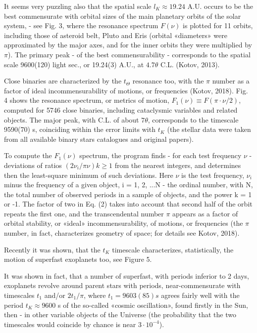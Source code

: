 \documentclass[twoside,draft]{article}
\begin{document}
\begin{sloppypar}
{It seems very puzzling also that the spatial scale $l_{K} \approx 19.24$ A.U. occurs to be the best
commensurate with orbital sizes of the main planetary orbits of the solar system, - see Fig. 3,
where the resonance spectrum $F( \nu )$ is plotted for 11 orbits, including those of asteroid belt, Pluto
and Eris (orbital «diameters» were approximated by the major axes, and for the inner orbits they
were multiplied by $\pi$). The primary peak - of the best commensurability - corresponds to the
spatial scale 9600(120) light sec., or 19.24(3) A.U., at $4.7 \theta$ C.L. (Kotov, 2013).

Close binaries are characterized by the $t_{\Theta}$ resonance too, with the $\pi$ number as a factor of ideal
incommensurability of motions, or frequencies (Kotov, 2018). Fig. 4 shows the resonance spectrum,
or metrics of motion, $F_{1} (\nu) \equiv F(\pi \cdot \nu/2)$, computed for 5746 close binaries, including cataclysmic
variables and related objects. The major peak, with C.L. of about $7 \theta$, corresponds to the timescale
9590(70) s, coinciding within the error limits with $t_{K}$ (the stellar data were taken from all available
binary stars catalogues and original papers).

To compute the $F_{1} (\nu)$ spectrum, the program finds - for each test frequency $\nu$ - deviations of
ratios $(2\nu_{i} /\pi \nu) k \geq 1$ from the nearest integers, and determines then the least-square minimum of such
deviations. Here $\nu$ is the test frequency, $\nu_{i}$ minus the frequency of a given object, i = 1, 2, ...N - the
ordinal number, with N, the total number of observed periods in a sample of objects, and the power
k = 1 or -1. The factor of two in Eq. (2) takes into account that second half of the orbit repeats the
first one, and the transcendental number $\pi$ appears as a factor of orbital stability, or «ideal»
incommensurability, of motions, or frequencies (the $\pi$ number, in fact, characterizes geometry of
space; for details see Kotov, 2018).

Recently it was shown, that the $t_K$ timescale characterizes, statistically, the motion of superfast
exoplanets too, see Figure 5.

It was shown in fact, that a number of superfast, with periods inferior to 2 days, exoplanets revolve
around parent stars with periods, near-commensurate with timescales $t_{1}$ and/or $2 t_{1}/\pi$, where $t_{1} =
9603(85) s$ agrees fairly well with the period $t_{K} \approx 9600$ s of the so-called «cosmic oscillation», found
firstly in the Sun, then - in other variable objects of the Universe (the probability that the two
timescales would coincide by chance is near $3 \cdot 10^{-4}$).

}
\end{sloppypar}
\end{document}
